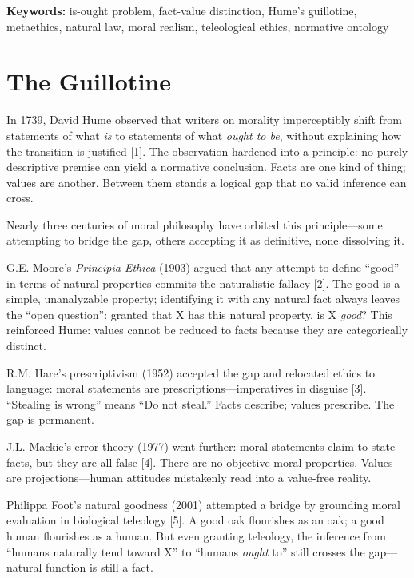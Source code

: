 \documentclass[12pt, letterpaper]{article}
\begin{document}
\vspace{1em}

\noindent\textbf{Keywords:} is-ought problem, fact-value distinction, Hume's guillotine, metaethics, natural law, moral realism, teleological ethics, normative ontology

\newpage
\setcounter{page}{1}
\onehalfspacing

\section{The Guillotine}

In 1739, David Hume observed that writers on morality imperceptibly shift from statements of what \textit{is} to statements of what \textit{ought to be}, without explaining how the transition is justified [1]. The observation hardened into a principle: no purely descriptive premise can yield a normative conclusion. Facts are one kind of thing; values are another. Between them stands a logical gap that no valid inference can cross.

Nearly three centuries of moral philosophy have orbited this principle---some attempting to bridge the gap, others accepting it as definitive, none dissolving it.

G.E. Moore's \textit{Principia Ethica} (1903) argued that any attempt to define ``good'' in terms of natural properties commits the naturalistic fallacy [2]. The good is a simple, unanalyzable property; identifying it with any natural fact always leaves the ``open question'': granted that X has this natural property, is X \textit{good}? This reinforced Hume: values cannot be reduced to facts because they are categorically distinct.

R.M. Hare's prescriptivism (1952) accepted the gap and relocated ethics to language: moral statements are prescriptions---imperatives in disguise [3]. ``Stealing is wrong'' means ``Do not steal.'' Facts describe; values prescribe. The gap is permanent.

J.L. Mackie's error theory (1977) went further: moral statements claim to state facts, but they are all false [4]. There are no objective moral properties. Values are projections---human attitudes mistakenly read into a value-free reality.

Philippa Foot's natural goodness (2001) attempted a bridge by grounding moral evaluation in biological teleology [5]. A good oak flourishes as an oak; a good human flourishes as a human. But even granting teleology, the inference from ``humans naturally tend toward X'' to ``humans \textit{ought} to'' still crosses the gap---natural function is still a fact.
\end{document}
